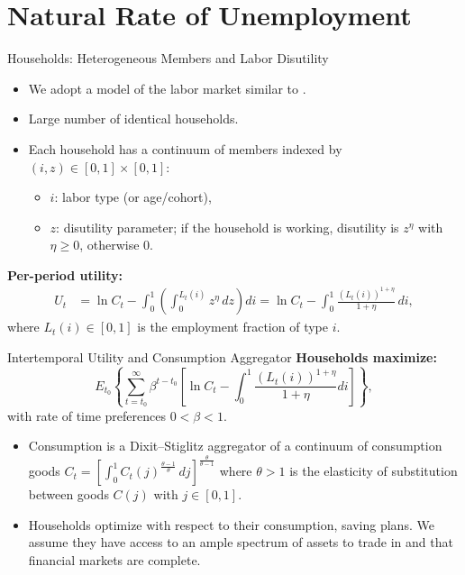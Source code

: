 \documentclass[11pt,aspectratio=169]{beamer}
\begin{document}
\section{Natural Rate of Unemployment}
\label{UN}

\begin{frame}{Households: Heterogeneous Members and Labor Disutility}
\begin{itemize}
  \item We adopt a model of the labor market similar to \textcite{Gali2009}. 
  \item Large number of identical households.
  \item Each household has a continuum of members indexed by $(i,z)\in[0,1]\times[0,1]$:
  \begin{itemize}
    \item $i$: labor type (or age/cohort),
    \item $z$: disutility parameter; if the household is working, disutility is $z^\eta$ with $\eta\ge 0$, otherwise $0$.
  \end{itemize}
\end{itemize}
\textbf{Per-period utility:}
\begin{align*}
U_t
&=\ln C_t-\int_0^1\left(\int_0^{L_t(i)} z^\eta\,dz\right)di
=\ln C_t-\int_0^1\frac{(L_t(i))^{1+\eta}}{1+\eta}\,di,
\end{align*}
where $L_t(i)\in[0,1]$ is the employment fraction of type $i$.
\end{frame}

\begin{frame}{Intertemporal Utility and Consumption Aggregator}
\textbf{Households maximize:}
\begin{equation}
E_{t_0}\left\{ \sum_{t=t_{0}}^{\infty }\beta ^{t-t_{0}}\left[ \ln
C_{t}-\int_{0}^{1}\frac{(L_{t}(i))^{1+\eta }}{1+\eta }di\right] \right\},
\label{eq1}
\end{equation}
with rate of time preferences $0<\beta<1$.
\begin{itemize}
    \item Consumption is a Dixit--Stiglitz aggregator of a continuum of consumption goods $C_t=\left[\int_0^1 C_t(j)^{\frac{\theta-1}{\theta}}\,dj\right]^{\frac{\theta}{\theta-1}}$ where $\theta>1$ is the elasticity of substitution between goods $C(j)$ with $j \in [0,1]$. 
    \item Households optimize with respect to their consumption, saving plans. We assume they have access to an ample spectrum of assets to trade in and that financial markets are complete. 
\end{itemize}
\end{frame}
\end{document}
